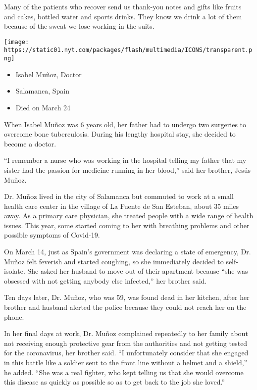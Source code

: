 Many of the patients who recover send us thank-you notes and gifts like
fruits and cakes, bottled water and sports drinks. They know we drink a
lot of them because of the sweat we lose working in the suits.

\texttt{[image: https://static01.nyt.com/packages/flash/multimedia/ICONS/transparent.png]}

\begin{itemize}
\tightlist
\item
  Isabel Muñoz, Doctor
\item
  Salamanca, Spain
\item
  Died on March 24
\end{itemize}

When Isabel Muñoz was 6 years old, her father had to undergo two
surgeries to overcome bone tuberculosis. During his lengthy hospital
stay, she decided to become a doctor.

``I remember a nurse who was working in the hospital telling my father
that my sister had the passion for medicine running in her blood,'' said
her brother, Jesús Muñoz.

Dr. Muñoz lived in the city of Salamanca but commuted to work at a small
health care center in the village of La Fuente de San Esteban, about 35
miles away. As a primary care physician, she treated people with a wide
range of health issues. This year, some started coming to her with
breathing problems and other possible symptoms of Covid-19.

On March 14, just as Spain's government was declaring a state of
emergency, Dr. Muñoz felt feverish and started coughing, so she
immediately decided to self-isolate. She asked her husband to move out
of their apartment because ``she was obsessed with not getting anybody
else infected,'' her brother said.

Ten days later, Dr. Muñoz, who was 59, was found dead in her kitchen,
after her brother and husband alerted the police because they could not
reach her on the phone.

In her final days at work, Dr. Muñoz complained repeatedly to her family
about not receiving enough protective gear from the authorities and not
getting tested for the coronavirus, her brother said. ``I unfortunately
consider that she engaged in this battle like a soldier sent to the
front line without a helmet and a shield,'' he added. ``She was a real
fighter, who kept telling us that she would overcome this disease as
quickly as possible so as to get back to the job she loved.''

